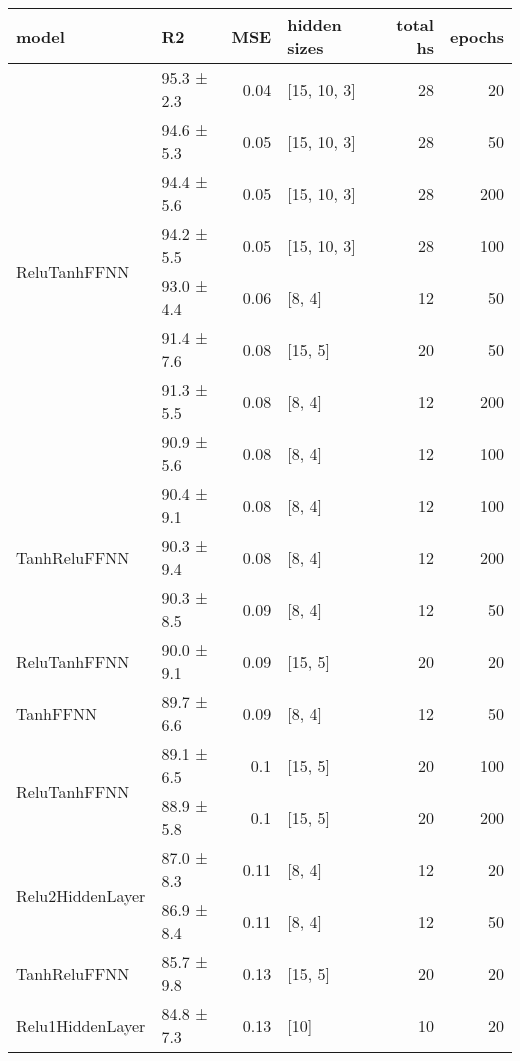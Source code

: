 \begin{longtable}{llrlrr}
\hline
 model   & R2          &   MSE & hidden sizes   &   total hs &   epochs \\
\hline
 \hline
\multirow{8}{*}{ReluTanhFFNN}         & 95.3 ± 2.3  &  0.04 & [15, 10, 3]    &         28 &       20 \\
         & 94.6 ± 5.3  &  0.05 & [15, 10, 3]    &         28 &       50 \\
         & 94.4 ± 5.6  &  0.05 & [15, 10, 3]    &         28 &      200 \\
         & 94.2 ± 5.5  &  0.05 & [15, 10, 3]    &         28 &      100 \\
         & 93.0 ± 4.4  &  0.06 & [8, 4]         &         12 &       50 \\
         & 91.4 ± 7.6  &  0.08 & [15, 5]        &         20 &       50 \\
         & 91.3 ± 5.5  &  0.08 & [8, 4]         &         12 &      200 \\
         & 90.9 ± 5.6  &  0.08 & [8, 4]         &         12 &      100 \\
 \hline
\multirow{3}{*}{TanhReluFFNN}         & 90.4 ± 9.1  &  0.08 & [8, 4]         &         12 &      100 \\
         & 90.3 ± 9.4  &  0.08 & [8, 4]         &         12 &      200 \\
         & 90.3 ± 8.5  &  0.09 & [8, 4]         &         12 &       50 \\
 \hline
ReluTanhFFNN         & 90.0 ± 9.1  &  0.09 & [15, 5]        &         20 &       20 \\
 \hline
TanhFFNN         & 89.7 ± 6.6  &  0.09 & [8, 4]         &         12 &       50 \\
 \hline
\multirow{2}{*}{ReluTanhFFNN}         & 89.1 ± 6.5  &  0.1  & [15, 5]        &         20 &      100 \\
         & 88.9 ± 5.8  &  0.1  & [15, 5]        &         20 &      200 \\
 \hline
\multirow{2}{*}{Relu2HiddenLayer}         & 87.0 ± 8.3  &  0.11 & [8, 4]         &         12 &       20 \\
         & 86.9 ± 8.4  &  0.11 & [8, 4]         &         12 &       50 \\
 \hline
TanhReluFFNN         & 85.7 ± 9.8  &  0.13 & [15, 5]        &         20 &       20 \\
 \hline
Relu1HiddenLayer         & 84.8 ± 7.3  &  0.13 & [10]           &         10 &       20 \\

\end{longtable}
